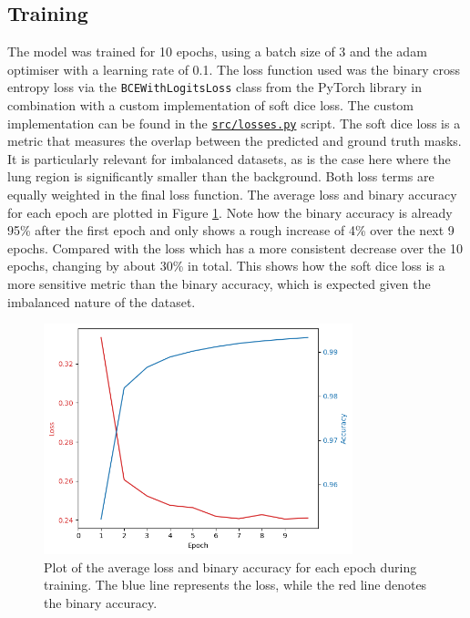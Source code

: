 \documentclass[11pt]{article}
\begin{document}
\subsection{Training}
The model was trained for 10 epochs, using a batch size of 3 and the adam optimiser with a learning rate of 0.1.
The loss function used was the binary cross entropy loss via the \texttt{BCEWithLogitsLoss} class from the PyTorch library in combination with a custom implementation of soft dice loss. The custom implementation can be found in the \texttt{\url{src/losses.py}} script. The soft dice loss is a metric that measures the overlap between the predicted and ground truth masks. It is particularly relevant for imbalanced datasets, as is the case here where the lung region is significantly smaller than the background. Both loss terms are equally weighted in the final loss function. The average loss and binary accuracy for each epoch are plotted in Figure \ref{fig:loss_plot}. Note how the binary accuracy is already 95\% after the first epoch and only shows a rough increase  of 4\% over the next 9 epochs. Compared with the loss which has a more consistent decrease over the 10 epochs, changing by about 30\% in total. This shows how the soft dice loss is a more sensitive metric than the binary accuracy, which is expected given the imbalanced nature of the dataset.

\begin{figure}[H]
    \centering
    \includegraphics[width=0.8\textwidth]{figs/train_metrics.png}
    \caption{Plot of the average loss and binary accuracy for each epoch during training. The blue line represents the loss, while the red line denotes the binary accuracy.}
    \label{fig:loss_plot}
\end{figure}
\end{document}
